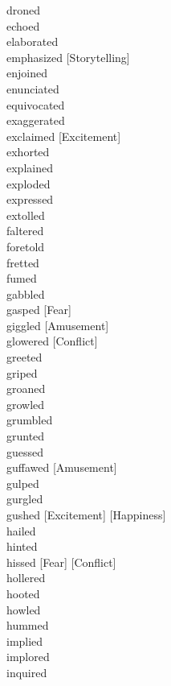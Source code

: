 droned \hfill \\
echoed \hfill \\
elaborated \hfill \\
emphasized [Storytelling] \hfill \\
enjoined \hfill \\
enunciated \hfill \\
equivocated \hfill \\
exaggerated \hfill \\
exclaimed [Excitement] \hfill \\
exhorted \hfill \\
explained \hfill \\
exploded \hfill \\
expressed \hfill \\
extolled \hfill \\
faltered \hfill \\
foretold \hfill \\
fretted \hfill \\
fumed \hfill \\
gabbled \hfill \\
gasped [Fear] \hfill \\
giggled [Amusement] \hfill \\
glowered [Conflict] \hfill \\
greeted \hfill \\
griped \hfill \\
groaned \hfill \\
growled \hfill \\
grumbled \hfill \\
grunted \hfill \\
guessed \hfill \\
guffawed [Amusement] \hfill \\
gulped \hfill \\
gurgled \hfill \\
gushed [Excitement] [Happiness] \hfill \\
hailed \hfill \\
hinted \hfill \\
hissed [Fear] [Conflict] \hfill \\
hollered \hfill \\
hooted \hfill \\
howled \hfill \\
hummed \hfill \\
implied \hfill \\
implored \hfill \\
inquired \hfill \\
